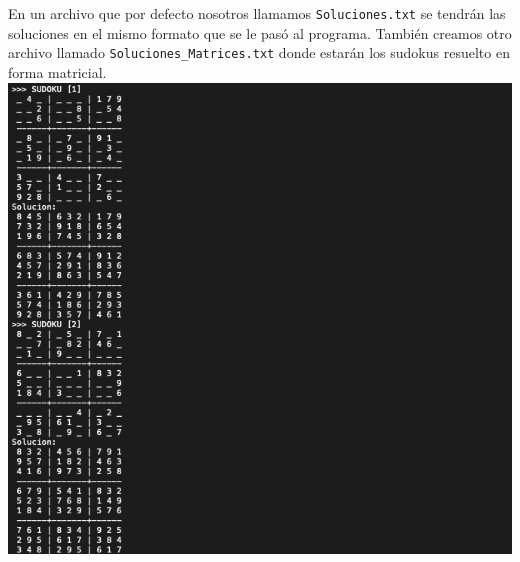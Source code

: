 \documentclass[letterpaper,12pt]{article}
\begin{document}
En un archivo que por defecto nosotros llamamos \texttt{Soluciones.txt} se tendrán las soluciones en el mismo formato que se le pasó al programa. También creamos otro archivo llamado \texttt{Soluciones\_Matrices.txt} donde estarán los sudokus resuelto en forma matricial.\\

\includegraphics[scale=0.4]{Matrix_Solve.png}\\
\end{document}
